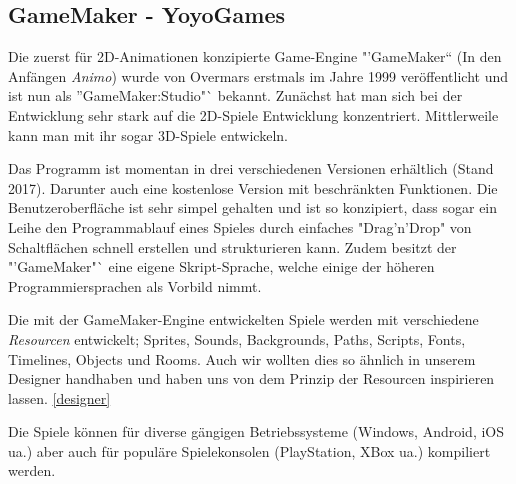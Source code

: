 \subsection{GameMaker - YoyoGames}

Die zuerst für 2D-Animationen konzipierte Game-Engine "'GameMaker"` (In den Anfängen \textit{Animo}) wurde von Overmars erstmals im Jahre 1999 veröffentlicht und ist nun als "'GameMaker:Studio"` bekannt. Zunächst hat man sich bei der Entwicklung sehr stark auf die 2D-Spiele Entwicklung konzentriert. Mittlerweile kann man mit ihr sogar 3D-Spiele entwickeln. 

Das Programm ist momentan in drei verschiedenen Versionen erhältlich (Stand 2017). Darunter auch eine kostenlose Version mit beschränkten Funktionen.
Die Benutzeroberfläche ist sehr simpel gehalten und ist so konzipiert, dass sogar ein Leihe den Programmablauf eines Spieles durch einfaches "Drag'n'Drop" von Schaltflächen schnell erstellen und strukturieren kann. Zudem besitzt der "'GameMaker"` eine eigene Skript-Sprache, welche einige der höheren Programmiersprachen als Vorbild nimmt.

Die mit der GameMaker-Engine entwickelten Spiele werden mit verschiedene \textit{Resourcen} entwickelt;
Sprites, Sounds, Backgrounds, Paths, Scripts, Fonts, Timelines, Objects und Rooms. 
Auch wir wollten dies so ähnlich in unserem Designer handhaben und haben uns von dem Prinzip der Resourcen inspirieren lassen. \ref{designer}

Die Spiele können für diverse gängigen Betriebssysteme (Windows, Android, iOS ua.) aber auch für populäre Spielekonsolen (PlayStation, XBox ua.) kompiliert werden. 
